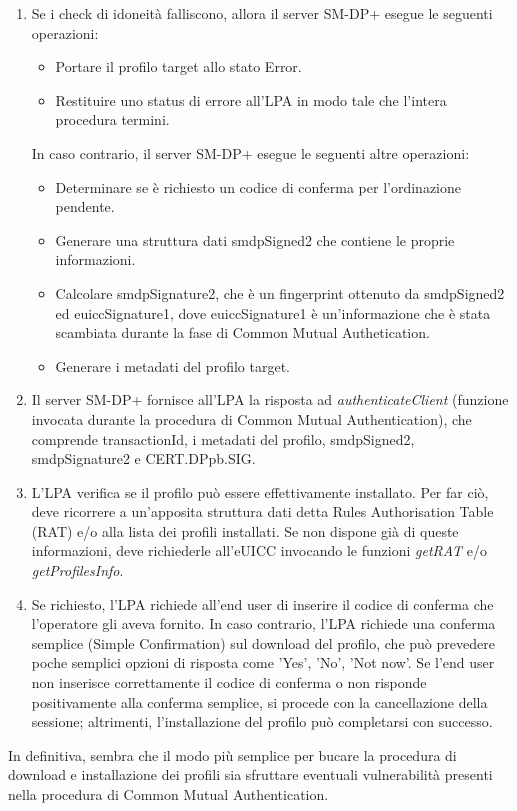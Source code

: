\documentclass[10pt, twoside, openany]{book}
\begin{document}
\begin{enumerate}
\item Se i check di idoneità falliscono, allora il server SM-DP+ esegue le seguenti operazioni:
\begin{itemize}[itemsep=0pt]
\item Portare il profilo target allo stato Error.
\item Restituire uno status di errore all'LPA in modo tale che l'intera procedura termini.
\end{itemize}
In caso contrario, il server SM-DP+ esegue le seguenti altre operazioni:
\begin{itemize}[itemsep=0pt]
\item Determinare se è richiesto un codice di conferma per l'ordinazione pendente.
\item Generare una struttura dati smdpSigned2 che contiene le proprie informazioni.
\item Calcolare smdpSignature2, che è un fingerprint ottenuto da smdpSigned2 ed euiccSignature1, dove euiccSignature1 è un'informazione che è stata scambiata durante la fase di Common Mutual Authetication.
\item Generare i metadati del profilo target.
\end{itemize}
\item Il server SM-DP+ fornisce all'LPA la risposta ad \textit{authenticateClient} (funzione invocata durante la procedura di Common Mutual Authentication), che comprende transactionId, i metadati del profilo, smdpSigned2, smdpSignature2 e CERT.DPpb.SIG.
\item L'LPA verifica se il profilo può essere effettivamente installato. Per far ciò, deve ricorrere a un'apposita struttura dati detta Rules Authorisation Table (RAT) e/o alla lista dei profili installati. Se non dispone già di queste informazioni, deve richiederle all'eUICC invocando le funzioni \textit{getRAT} e/o \textit{getProfilesInfo}.
\item Se richiesto, l'LPA richiede all'end user di inserire il codice di conferma che l'operatore gli aveva fornito. In caso contrario, l'LPA richiede una conferma semplice (Simple Confirmation) sul download del profilo, che può prevedere poche semplici opzioni di risposta come 'Yes', 'No', 'Not now'. Se l'end user non inserisce correttamente il codice di conferma o non risponde positivamente alla conferma semplice, si procede con la cancellazione della sessione; altrimenti, l'installazione del profilo può completarsi con successo.
\end{enumerate}
In definitiva, sembra che il modo più semplice per bucare la procedura di download e installazione dei profili sia sfruttare eventuali vulnerabilità presenti nella procedura di Common Mutual Authentication.
\end{document}
